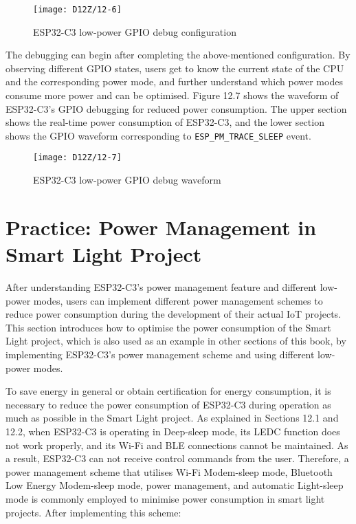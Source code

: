 \documentclass[a4paper,12pt]{book}
\begin{document}
\begin{figure}[!h]
    \centering
    \texttt{[image: D12Z/12-6]}
    \caption{ESP32-C3 low-power GPIO debug configuration}
\end{figure}

The debugging can begin after completing the above-mentioned configuration. By observing different GPIO states, users get to know the current state of the CPU and the corresponding power mode, and further understand which power modes consume more power and can be optimised. Figure 12.7 shows the waveform of ESP32-C3’s GPIO debugging for reduced power consumption. The upper section shows the real-time power consumption of ESP32-C3, and the lower section shows the GPIO waveform corresponding to \verb|ESP_PM_TRACE_SLEEP| event.

\begin{figure}[!h]
    \centering
    \texttt{[image: D12Z/12-7]}
    \caption{ESP32-C3 low-power GPIO debug waveform}
\end{figure}

\section{Practice: Power Management in Smart Light Project}
After understanding ESP32-C3’s power management feature and different low-power modes, users can implement different power management schemes to reduce power consumption during the development of their actual IoT projects. This section introduces how to optimise the power consumption of the Smart Light project, which is also used as an example in other sections of this book, by implementing ESP32-C3's power management scheme and using different low-power modes.

To save energy in general or obtain certification for energy consumption, it is necessary to reduce the power consumption of ESP32-C3 during operation as much as possible in the Smart Light project. As explained in Sections 12.1 and 12.2, when ESP32-C3 is operating in Deep-sleep mode, its LEDC function does not work properly, and its Wi-Fi and BLE connections cannot be maintained. As a result, ESP32-C3 can not receive control commands from the user. Therefore, a power management scheme that utilises Wi-Fi Modem-sleep mode, Bluetooth Low Energy Modem-sleep mode, power management, and automatic Light-sleep mode is commonly employed to minimise power consumption in smart light projects. After implementing this scheme:
\end{document}
